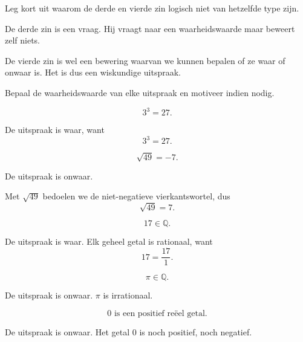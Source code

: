 \documentclass{ximera}
\begin{document}
\begin{oefening}{\oefB \ESS}
\begin{question}
Leg kort uit waarom de derde en vierde zin logisch niet van hetzelfde
type zijn.

\begin{oplossing}
De derde zin is een vraag. Hij vraagt naar een waarheidswaarde maar
beweert zelf niets.

De vierde zin is wel een bewering waarvan we kunnen bepalen of ze waar
of onwaar is. Het is dus een wiskundige uitspraak.
\end{oplossing}
\end{question}

\end{oefening}



\begin{oefening}{\oefB \ESS}

Bepaal de waarheidswaarde van elke uitspraak en motiveer indien nodig.

\begin{question}
\[
3^3=27.
\]

\begin{oplossing}
De uitspraak is waar, want
\[
3^3=27.
\]
\end{oplossing}
\end{question}


\begin{question}
\[
\sqrt{49}=-7.
\]

\begin{oplossing}
De uitspraak is onwaar.

Met $\sqrt{49}$ bedoelen we de niet-negatieve vierkantswortel, dus
\[
\sqrt{49}=7.
\]
\end{oplossing}
\end{question}


\begin{question}
\[
17\in\mathbb{Q}.
\]

\begin{oplossing}
De uitspraak is waar. Elk geheel getal is rationaal, want
\[
17=\frac{17}{1}.
\]
\end{oplossing}
\end{question}


\begin{question}
\[
\pi\in\mathbb{Q}.
\]

\begin{oplossing}
De uitspraak is onwaar. $\pi$ is irrationaal.
\end{oplossing}
\end{question}


\begin{question}
\[
0\text{ is een positief reëel getal.}
\]

\begin{oplossing}
De uitspraak is onwaar. Het getal $0$ is noch positief, noch negatief.
\end{oplossing}
\end{question}

\end{oefening}
\end{document}
